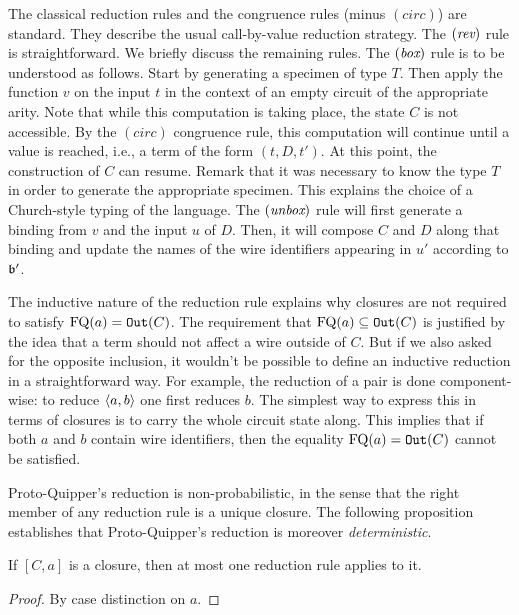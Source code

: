 \documentclass[twoside]{article}
\begin{document}
The classical reduction rules and the congruence rules (minus $(circ)$) 
are standard. They describe the usual call-by-value reduction strategy. 
The $(\mathop{\textit{rev}}\nolimits)$ rule is straightforward. We briefly discuss the remaining 
rules. The $(\mathop{\textit{box}}\nolimits)$ rule is to be understood as follows. Start by 
generating a specimen of type $T$. Then apply the function $v$ on the 
input $t$ in the context of an empty circuit of the appropriate arity. 
Note that while this computation is taking place, the state $C$ is not 
accessible. By the $(circ)$ congruence rule, this computation will 
continue until a value is reached, i.e., a term of the form $(t,D,t')$. 
At this point, the construction of $C$ can resume. Remark that it was 
necessary to know the type $T$ in order to generate the appropriate 
specimen. This explains the choice of a Church-style typing of the 
language. The $(\mathop{\textit{unbox}}\nolimits)$ rule will first generate a binding from $v$ 
and the input $u$ of $D$. Then, it will compose $C$ and $D$ along that 
binding and update the names of the wire identifiers appearing in $u'$ 
according to $\mathfrak{b}'$.

The inductive nature of the reduction rule explains why closures are 
not required to satisfy $\mathop{\textrm{FQ}}\nolimits(a)=\mathtt{Out}(C)$. The requirement that 
$\mathop{\textrm{FQ}}\nolimits(a)\subseteq \mathtt{Out}(C)$ is justified by the idea that a term 
should not affect a wire outside of $C$. But if we also asked for the 
opposite inclusion, it wouldn't be possible to define an inductive 
reduction in a straightforward way. For example, the reduction of a 
pair is done component-wise: to reduce $\langle a,b\rangle$ one first reduces $b$. 
The simplest way to express this in terms of closures is to carry the 
whole circuit state along. This implies that if both $a$ and $b$ 
contain wire identifiers, then the equality $\mathop{\textrm{FQ}}\nolimits(a)=\mathtt{Out}(C)$ 
cannot be satisfied.

Proto-Quipper's reduction is non-probabilistic, in the sense that the 
right member of any reduction rule is a unique closure. The following 
proposition establishes that Proto-Quipper's reduction is moreover  
\emph{deterministic}.

\begin{proposition}
\label{determinicity}
If $[C,a]$ is a closure, then at most one reduction rule applies
to it.
\end{proposition}

\begin{proof}
By case distinction on $a$.
\end{proof}


\clearpage
\end{document}
